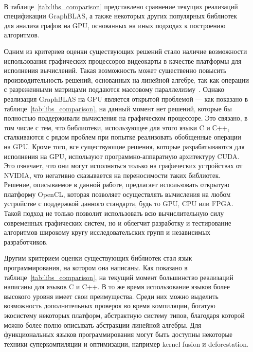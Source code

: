 \label{sec:relatedworks}
\paragraph{} 
В таблице~\ref{tab:libs_comparison} представлено сравнение текущих реализаций спецификации GraphBLAS, а также некоторых других популярных библиотек для анализа графов на GPU, основанных на иных подходах к построению алгоритмов.

Одним из критериев оценки существующих решений стало наличие возможности использования графических процессоров видеокарты в качестве платформы для исполнения вычислений. Такая возможность может существенно повысить производительность решений, основанных на линейной алгебре, так как операции с разреженными матрицами поддаются массовому параллелизму~\cite{blast}. Однако реализация GraphBLAS на GPU является открытой проблемой --- как показано в таблице~\ref{tab:libs_comparison}, на данный момент нет решений, которые бы полностью поддерживали вычисления на графическом процессоре. Это связано, в том числе с тем, что библиотеки, использующее для этого языки C и С++, сталкиваются с рядом проблем при попытке реализовать обобщенные операции на GPU. Кроме того, все существующие решения, которые разрабатываются для исполнения на GPU, используют программно-аппаратную архитектуру CUDA. Это оз\-на\-ча\-ет, что они могут исполняться только на графических устройствах от NVIDIA, что негативно сказывается на переносимости таких библиотек. Решение, описываемое в данной работе, предлагает использовать открытую платформу OpenCL, которая позволяет осуществлять вычисления на любом устройстве с поддержкой данного стандарта, будь то GPU, CPU или FPGA. Такой подход не только позволит использовать всю вычислительную силу современных графических систем, но и облегчит разработку и тестирование алгоритмов широкому кругу исследовательских групп и независимых разработчиков.

Другим критерием оценки существующих библиотек стал язык программирования, на котором она написаны. Как показано в таблице~\ref{tab:libs_comparison}, на текущий момент большинство реализаций написаны для языков C и C++. В то же время использование языков более высокого уровня имеет свои преимущества. Среди них можно выделить возможность дополнительных проверок во время компиляции, богатую экосистему некоторых платформ, абстрактную систему типов, благодаря которой можно более полно описывать абстракции линейной алгебры. Для функциональных языков программирования могут быть доступны некоторые техники суперкомпиляции и оптимизации, например kernel fusion\cite{fusion} и deforestation\cite{deforset}.

